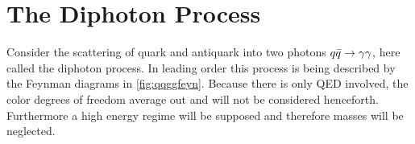 
\chapter{The Diphoton Process}%
\label{chap:qqgg}

Consider the scattering of quark and antiquark into two photons
\(q\bar{q}\rightarrow\gamma\gamma\), here called the diphoton process. In leading order this
process is being described by the Feynman diagrams in
\cref{fig:qqggfeyn}.  Because there is only QED involved, the color
degrees of freedom average out and will not be considered henceforth.
Furthermore a high energy regime will be supposed and therefore masses
will be neglected.
